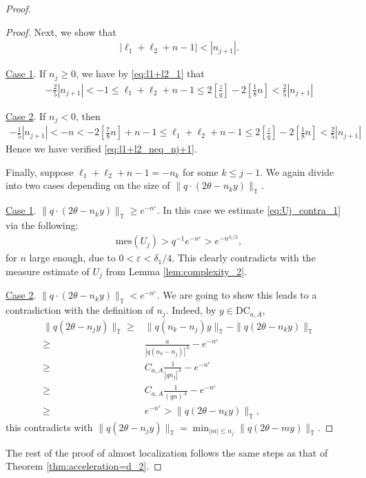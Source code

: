 \documentclass[11pt]{amsart}
\newcommand{\T}{\mathbb T}
\begin{document}
\begin{proof}
\begin{proof}
Next, we show that 
\begin{align}\label{eq:l1+l2_neq_nj+1}
|\ell_1+\ell_2+n-1|<|n_{j+1}|.
\end{align}

\underline{Case 1}. If $n_j\geq 0$, we have by \eqref{eq:l1+l2_1} that
\begin{align}
    -\frac{2}{5}|n_{j+1}|<-1\leq \ell_1+\ell_2+n-1\leq 2[\frac{z}{q}]-2[\frac{1}{8}n]<\frac{2}{5}|n_{j+1}|
\end{align}

\underline{Case 2}. If $n_j<0$, then
\begin{align}
    -\frac{1}{5}|n_{j+1}|<-n<-2[\frac{7}{8}n]+n-1\leq \ell_1+\ell_2+n-1\leq 2[\frac{z}{q}]-2[\frac{1}{8}n]<\frac{2}{5}|n_{j+1}|
\end{align}
Hence we have verified \eqref{eq:l1+l2_neq_nj+1}.

Finally, suppose   $\ell_1+\ell_2+n-1=-n_k$ for some $k\leq j-1$. We again divide into two cases depending on the size of $\|q\cdot (2\theta-n_k y)\|_{\T}$.

\underline{Case 1}. 
$\|q\cdot (2\theta-n_k y)\|_{\T}\geq e^{-n^{\varepsilon}}$.
In this case we estimate \eqref{eq:Uj_contra_1} via the following:
\begin{align}\label{eq:Uj_contra_2}
    \mathrm{mes}(U_j)>q^{-1} e^{-n^{\varepsilon}}>e^{-n^{\delta_1/2}}, 
\end{align}
for $n$ large enough, due to $0<\varepsilon<\delta_1/4$.
This clearly contradicts with the measure estimate of $U_j$ from Lemma \ref{lem:complexity_2}.

\underline{Case 2}.
$\|q\cdot (2\theta-n_k y)\|_{\T}< e^{-n^{\varepsilon}}$. We are going to show this leads to a contradiction with the definition of $n_j$. 
Indeed, by $y\in \mathrm{DC}_{a,A}$,  
\begin{align}
    \|q (2\theta-n_j y)\|_{\T}
    \geq &\|q(n_k-n_j)y\|_{\T}-\|q(2\theta-n_k y)\|_{\T}\\
    \geq &\frac{a}{|q(n_k-n_j)|^A}-e^{-n^{\varepsilon}}\\
    \geq &C_{a,A} \frac{1}{|qn_j|^A}-e^{-n^{\varepsilon}}\\
    \geq &C_{a,A} \frac{1}{(qn)^A}-e^{-n^{\varepsilon}}\\
    \geq &e^{-n^{\varepsilon}}>\|q(2\theta-n_k y)\|_{\T},
\end{align}
this contradicts with $\|q(2\theta-n_jy)\|_{\T}=\min_{|m|\leq n_j}\|q(2\theta-my)\|_{\T}$.
\end{proof}
The rest of the proof of almost localization follows the same steps as that of Theorem \ref{thm:acceleration=d_2}.
\end{proof}
\end{document}

